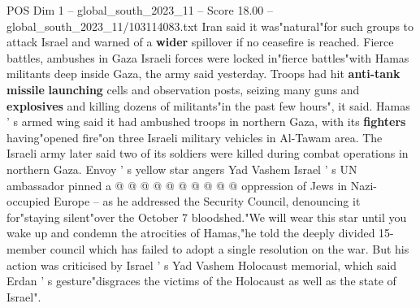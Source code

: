 \begin{textsample}{POS Dim 1 – global\_south\_2023\_11 – Score 18.00 – global\_south\_2023\_11/103114083.txt}
Iran said it was"natural"for such groups to attack Israel and warned of a \textbf{wider} spillover if no ceasefire is reached.
Fierce battles, ambushes in Gaza Israeli forces were locked in"fierce battles"with Hamas militants deep inside Gaza, the army said yesterday.
Troops had hit \textbf{anti-tank} \textbf{missile} \textbf{launching} cells and observation posts, seizing many guns and \textbf{explosives} and killing dozens of militants"in the past few hours", it said.
Hamas ' s armed wing said it had ambushed troops in northern Gaza, with its \textbf{fighters} having"opened fire"on three Israeli military vehicles in Al-Tawam area.
The Israeli army later said two of its soldiers were killed during combat operations in northern Gaza.
Envoy ' s yellow star angers Yad Vashem Israel ' s UN ambassador pinned a @ @ @ @ @ @ @ @ @ @ oppression of Jews in Nazi-occupied Europe -- as he addressed the Security Council, denouncing it for"staying silent"over the October 7 bloodshed."We will wear this star until you wake up and condemn the atrocities of Hamas,"he told the deeply divided 15-member council which has failed to adopt a single resolution on the war.
But his action was criticised by Israel ' s Yad Vashem Holocaust memorial, which said Erdan ' s gesture"disgraces the victims of the Holocaust as well as the state of Israel".

\end{textsample}
